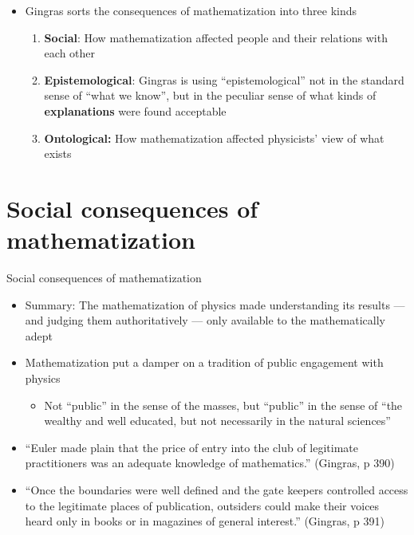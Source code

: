 \documentclass[fleqn]{beamer}
\newcommand{\kw}[1]{\textbf{#1}}
\begin{document}
\begin{frame}

  \begin{itemize}
  \item Gingras sorts the consequences of mathematization into three
    kinds
    \begin{enumerate}
    \item \kw{Social}: How mathematization affected people and their
      relations with each other
    \item \kw{Epistemological}: Gingras is using ``epistemological''
      not in the standard sense of ``what we know'', but in the
      peculiar sense of what kinds of \kw{explanations} were found
      acceptable
    \item \kw{Ontological:} How mathematization affected physicists'
      view of what exists
    \end{enumerate}

    
  \end{itemize}
\end{frame}

\section{Social consequences of mathematization}

\begin{frame}{Social consequences of mathematization}

  \begin{itemize}
  \item Summary: The mathematization of physics made understanding its
    results --- and judging them authoritatively --- only available to
    the mathematically adept
  \item Mathematization put a damper on a tradition of public
    engagement with physics
    \begin{itemize}
    \item Not ``public'' in the sense of the masses, but ``public'' in
      the sense of ``the wealthy and well educated, but not
      necessarily in the natural sciences''
    \end{itemize}
  \end{itemize}

\end{frame}

\begin{frame}

  \begin{itemize}
  \item ``Euler made plain that the price of entry into the club of
    legitimate practitioners was an adequate knowledge of
    mathematics.'' (Gingras, p 390)
  \item ``Once the boundaries were well defined and the gate keepers
    controlled access to the legitimate places of publication,
    outsiders could make their voices heard only in books or in
    magazines of general interest.'' (Gingras, p 391)
  \end{itemize}


\end{frame}
\end{document}

